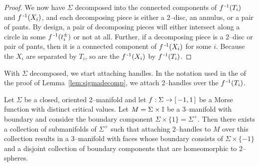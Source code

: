\begin{proof}
	
	We now have $\Sigma$ decomposed into the connected components of $f^{\,\text{-}1}(T_i)$ and $f^{\,\text{-}1}(X_i)$, and each decomposing piece is either a 2--disc, an annulus, or a pair of pants.
	By design, a pair of decomposing pieces will either intersect along a circle in some $f^{\,\text{-}1}(t_i^\pm)$ or not at all.
	Further, if a decomposing piece is a 2--disc or pair of pants, then it is a connected component of $f^{\,\text{-}1}(X_i)$ for some $i$.
	Because the $X_i$ are separated by $T_i$, so are the $f^{\,\text{-}1}(X_i)$ by $f^{\,\text{-}1}(T_i)$.	
\end{proof}

With $\Sigma$ decomposed, we start attaching handles.
In the notation used in the of the proof of Lemma~\ref{lem:sigmadecomp}, we attach 2--handles over the $f^{\,\text{-}1}(T_i)$.

\begin{lem}
	\label{lem:sigma2handles}
	Let $\Sigma$ be a closed, oriented 2--manifold and let $f:\Sigma\to[\,-1,1\,]$ be a Morse function with distinct critical values.
	Let $M=\Sigma\times\mathbb{I}$ be a 3--manifold with boundary and consider the boundary component $\Sigma\times\{1\}=\Sigma^+$.
	Then there exists a collection of submanifolds of $\Sigma^+$ such that attaching 2--handles to $M$ over this collection results in a 3--manifold with faces whose boundary consists of $\Sigma\times\{-1\}$ and a disjoint collection of boundary components that are homeomorphic to 2--spheres.
\end{lem}


